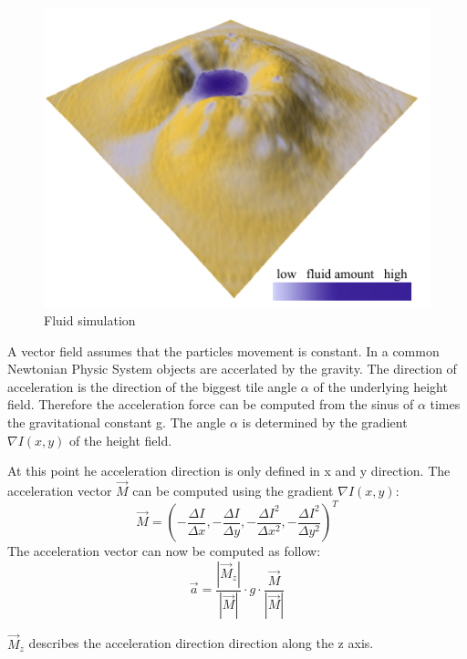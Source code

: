 \begin{figure}
	\centering
	\includegraphics[width=\linewidth]{NWD05/hydraulic_errosion_b}
	\caption{Fluid simulation}
	\label{fig:calc_acceleration}
\end{figure}

A vector field assumes that the particles movement is constant. In a common Newtonian Physic System objects are accerlated by the gravity. The direction of acceleration is the direction of the biggest tile angle $\alpha$ of the underlying height field. Therefore the acceleration force can be computed from the sinus of $\alpha$ times the gravitational constant g. The angle $\alpha$ is determined by the gradient $\nabla I(x,y)$ of the height field. 

At this point he acceleration direction is only defined in x and y direction. The acceleration vector $\vec{M}$ can be computed using the gradient $\nabla I(x,y)$: 
$$\vec{M} = (- \frac{\Delta I}{\Delta x}, - \frac{\Delta I}{\Delta y}, - \frac{\Delta I^2}{\Delta x^2}, - \frac{\Delta I^2}{\Delta y^2})^T$$
The acceleration vector can now be computed as follow: 
$$\vec{a}= \frac{|\vec{M}_z|}{|\vec{M}|} \cdot g \cdot \frac{\vec{M}}{|\vec{M}|}$$

$\vec{M}_z$ describes the acceleration direction direction along the z axis.

